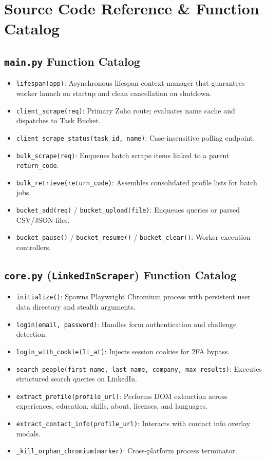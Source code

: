 \documentclass[11pt,a4paper]{report}
\begin{document}
\chapter{Source Code Reference \& Function Catalog}

\section{\texttt{main.py} Function Catalog}
\begin{itemize}[leftmargin=*]
    \item \texttt{lifespan(app)}: Asynchronous lifespan context manager that guarantees worker launch on startup and clean cancellation on shutdown.
    \item \texttt{client\_scrape(req)}: Primary Zoho route; evaluates name cache and dispatches to Task Bucket.
    \item \texttt{client\_scrape\_status(task\_id, name)}: Case-insensitive polling endpoint.
    \item \texttt{bulk\_scrape(req)}: Enqueues batch scrape items linked to a parent \texttt{return\_code}.
    \item \texttt{bulk\_retrieve(return\_code)}: Assembles consolidated profile lists for batch jobs.
    \item \texttt{bucket\_add(req)} / \texttt{bucket\_upload(file)}: Enqueues queries or parsed CSV/JSON files.
    \item \texttt{bucket\_pause()} / \texttt{bucket\_resume()} / \texttt{bucket\_clear()}: Worker execution controllers.
\end{itemize}

\section{\texttt{core.py} (\texttt{LinkedInScraper}) Function Catalog}
\begin{itemize}[leftmargin=*]
    \item \texttt{initialize()}: Spawns Playwright Chromium process with persistent user data directory and stealth arguments.
    \item \texttt{login(email, password)}: Handles form authentication and challenge detection.
    \item \texttt{login\_with\_cookie(li\_at)}: Injects session cookies for 2FA bypass.
    \item \texttt{search\_people(first\_name, last\_name, company, max\_results)}: Executes structured search queries on LinkedIn.
    \item \texttt{extract\_profile(profile\_url)}: Performs DOM extraction across experiences, education, skills, about, licenses, and languages.
    \item \texttt{extract\_contact\_info(profile\_url)}: Interacts with contact info overlay modals.
    \item \texttt{\_kill\_orphan\_chromium(marker)}: Cross-platform process terminator.
\end{itemize}
\end{document}

